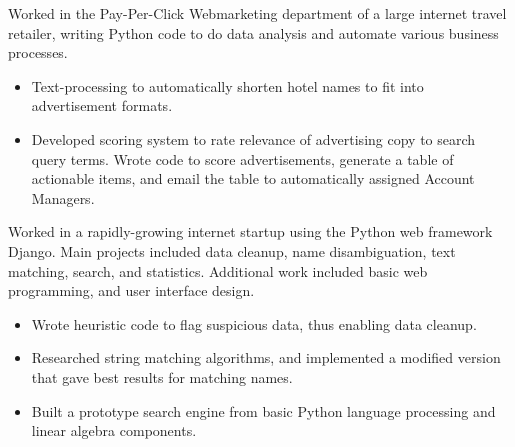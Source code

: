 \documentclass[11pt,a4paper,sans]{moderncv} %
\begin{document}
\vspace{0.2em}

{Worked in the Pay-Per-Click Webmarketing department of a large internet travel retailer, writing Python code to do data analysis and automate various business processes.
	\begin{itemize}
		\item Text-processing to automatically shorten hotel names to fit into advertisement formats.
		\item Developed scoring system to rate relevance of advertising copy to search query terms.  Wrote code to score advertisements, generate a table of actionable items, and email the table to automatically assigned Account Managers.
	\end{itemize}
}

\vspace{0.2em}

{Worked in a rapidly-growing internet startup using the Python web framework Django.  Main projects included data cleanup, name disambiguation, text matching, search, and statistics.  Additional work included basic web programming, and user interface design.  
\begin{itemize}
	\item Wrote heuristic code to flag suspicious data, thus enabling data cleanup.
	\item Researched string matching algorithms, and implemented a modified version that gave best results for matching names.
	\item Built a prototype search engine from basic Python language processing and linear algebra components.
\end{itemize}
}
\end{document}
